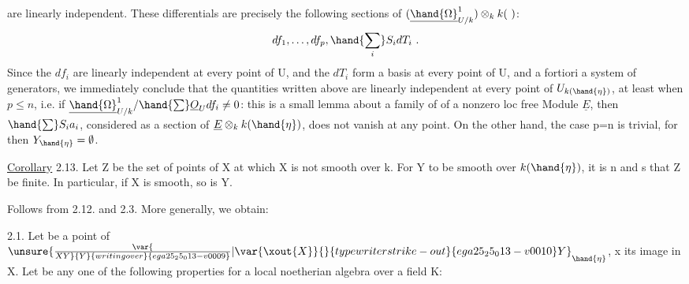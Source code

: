 
are linearly independent. These differentials are precisely
the following sections of $(\underline{\hand{\Omega}}^1_{U/k})\otimes_k k(\ )$:
\[ df_1, \ldots, df_p , \hand{\sum_i} S_i dT_i \ . \]
Since the $df_i$ are linearly independent at every point of U, and
the $dT_i$ form a basis  at every point of U,  and a fortiori
a system of generators, we immediately conclude that the
quantities written above are linearly independent at every point of $U_{k(\hand{\eta})}$, at least
when $p\leq n$, i.e. if  $\underline{\hand{\Omega}}^1_{U/k} / \hand{\sum} \underline{O}_U df_i \neq 0$: this is a small
lemma about a family of   of a nonzero loc free Module $\underline{E}$,
then $\hand{\sum} S_i a_i$, considered as a section of $\underline{E}\otimes_k k(\hand{\eta})$, does not vanish
at any point. On the other hand, the case p=n is trivial, for then
$Y_{\hand{\eta}} = \emptyset$.

\uline{Corollary} 2.13. Let Z be the set of points of X at which X
is not smooth over k. For Y to be smooth over $k(\hand{\eta})$, it is n and s
that Z be finite. In particular, if X is smooth, so is
Y.

Follows from 2.12. and 2.3. More generally, we obtain:

\uline{} 2.1. Let  be a point of $\unsure{\var{\over{X}{Y}}{Y}{writing over}{ega25_25_013-v0009}|\var{\xout{X}}{}{typewriter strike-out}{ega25_25_013-v0010}Y}_{\hand{\eta}}$, x its image in X. Let
  be any one of the following properties for a local
noetherian algebra over a field K:

